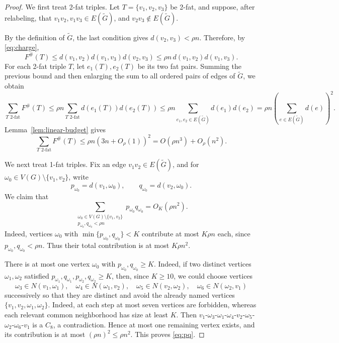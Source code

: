 \documentclass[11pt,letterpaper]{article}
\begin{document}
\begin{proof}
We first treat 2-fat triples. Let \(T=\{v_1,v_2,v_3\}\) be 2-fat, and suppose, after relabeling, that
  \(v_1v_2,v_1v_3\in E(\tilde{G})\), and \(v_2v_3\notin E(\tilde{G})\).

By the definition of \(\tilde{G}\), the last condition gives \(d(v_2,v_3)<\rho n\). Therefore, by
\eqref{eq:charge},
\[
  F^{\#}(T)
  \le d(v_1,v_2)d(v_1,v_3)d(v_2,v_3)
  \le \rho n\,d(v_1,v_2)d(v_1,v_3).
\]
For each 2-fat triple \(T\), let \(e_1(T),e_2(T)\) be its two fat pairs. Summing the previous bound
and then enlarging the sum to all ordered pairs of edges of \(\tilde{G}\), we obtain
\[
  \sum_{T\text{ 2-fat}}F^{\#}(T)
  \le \rho n\sum_{T\text{ 2-fat}}d(e_1(T))d(e_2(T))
  \le \rho n\sum_{e_1,e_2\in E(\tilde{G})}d(e_1)d(e_2)
  =\rho n\left(\sum_{e\in E(\tilde{G})}d(e)\right)^2.
\]
Lemma~\ref{lem:linear-budget} gives
\[
  \sum_{T\text{ 2-fat}}F^{\#}(T)
  \le \rho n(3n+O_\rho(1))^2
  =O(\rho n^3)+O_\rho(n^2).
\]


We next treat 1-fat triples. Fix an edge \(v_1v_2\in E(\tilde{G})\), and for
\(\omega_0\in V(G)\setminus\{v_1,v_2\}\), write
\[
  p_{\omega_0}=d(v_1,\omega_0),\qquad q_{\omega_0}=d(v_2,\omega_0).
\]
We claim that
\begin{equation}\label{eq:pq}
  \sum_{\substack{\omega_0\in V(G)\setminus\{v_1,v_2\}\\p_{\omega_0},q_{\omega_0}<\rho n}}
  p_{\omega_0}q_{\omega_0}
  =O_K(\rho n^2).
\end{equation}
Indeed, vertices \(\omega_0\) with \(\min\{p_{\omega_0},q_{\omega_0}\}<K\) contribute at most \(K\rho n\)
each, since \(p_{\omega_0},q_{\omega_0}<\rho n\). Thus their total contribution is at most
\(K\rho n^2\).

There is at most one vertex \(\omega_0\) with \(p_{\omega_0},q_{\omega_0}\ge K\). Indeed, if two
distinct vertices \(\omega_1,\omega_2\) satisfied
$p_{\omega_1},q_{\omega_1},p_{\omega_2},q_{\omega_2}\ge K$,
then, since \(K\ge10\), we could choose vertices
\[
  \omega_3\in N(v_1,\omega_1),\quad
  \omega_4\in N(\omega_1,v_2),\quad
  \omega_5\in N(v_2,\omega_2),\quad
  \omega_6\in N(\omega_2,v_1)
\]
successively so that they are distinct and avoid the already named vertices
\(\{v_1,v_2,\omega_1,\omega_2\}\). Indeed, at each step at most seven vertices are forbidden,
whereas each relevant common neighborhood has size at least \(K\).
Then
  $v_1$-$\omega_3$-$\omega_1$-$\omega_4$-$v_2$-$\omega_5$-$\omega_2$-$\omega_6$-$v_1$
is a \(C_8\), a contradiction. Hence at most one remaining vertex exists, and its contribution is at
most \((\rho n)^2\le\rho n^2\). This proves \eqref{eq:pq}.


\end{proof}
\end{document}
